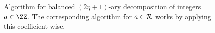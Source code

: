 \begin{figure}[hpt]
 \centering
 \begin{pcvstack}
 \end{pcvstack}
 \caption{%
 Algorithm for balanced $(2\eta+1)$-ary decomposition of integers $a\in\ZZ$. The corresponding algorithm for $a\in\mathcal{R}$ works by applying this coefficient-wise.
 }
 \label{alg:decomp}
\end{figure}

